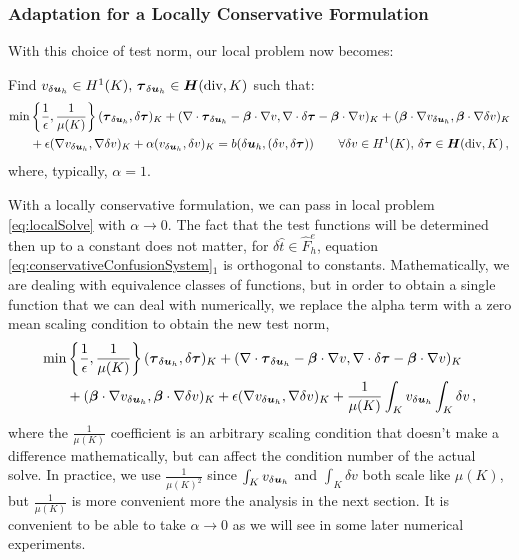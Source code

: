 \documentclass[Proposal.tex]{subfiles}
\begin{document}
\subsubsection{Adaptation for a Locally Conservative Formulation}
With this choice of test norm, our local problem now becomes:

Find $v_{\delta\boldsymbol{u}_h}\in H^{1}(K),\,\boldsymbol\tau_{\delta\boldsymbol{u}_h}\in\mbox{\boldmath $H$}(\text{div},K)$ such that:
\begin{align}
\min&\left\{\frac{1}{\epsilon},\frac{1}{\mu(K)}\right\}(\boldsymbol\tau_{\delta\boldsymbol{u}_h},\delta\boldsymbol\tau)_K
+(\nabla\cdot\boldsymbol\tau_{\delta\boldsymbol{u}_h}-\boldsymbol\beta\cdot\nabla
v,\nabla\cdot\delta\boldsymbol\tau-\boldsymbol\beta\cdot\nabla v)_K
+(\boldsymbol\beta\cdot\nabla v_{\delta\boldsymbol{u}_h},\boldsymbol\beta\cdot\nabla \delta v)_K\nonumber\\
&+\epsilon(\nabla v_{\delta\boldsymbol{u}_h},\nabla \delta v)_K
+\alpha(v_{\delta\boldsymbol{u}_h},\delta v)_K
=b(\delta\boldsymbol{u}_h,(\delta v,\delta\boldsymbol\tau))
\quad\quad\forall\delta v\in H^{1}(K),\,\delta\boldsymbol\tau\in\mbox{\boldmath $H$}(\text{div},K)\,,
\label{eq:localSolve}
\end{align}
where, typically, $\alpha=1$.

With a locally conservative formulation, we can pass in local problem
\eqref{eq:localSolve} with $\alpha\rightarrow0$. The fact that the test
functions will be determined then up to a constant does not matter, for
$\delta\hat t\in\hat F_h^e$, equation
\eqref{eq:conservativeConfusionSystem}$_1$ is orthogonal to constants.
Mathematically, we are dealing with equivalence classes of functions, but in
order to obtain a single function that we can deal with numerically, we
replace the alpha term with a zero mean scaling condition to obtain the new
test norm,
\begin{align}
\label{eq:localSolveMod}
\min&\left\{\frac{1}{\epsilon},\frac{1}{\mu(K)}\right\}(\boldsymbol\tau_{\delta\boldsymbol{u}_h},\delta\boldsymbol\tau)_K
+(\nabla\cdot\boldsymbol\tau_{\delta\boldsymbol{u}_h}-\boldsymbol\beta\cdot\nabla
v,\nabla\cdot\delta\boldsymbol\tau-\boldsymbol\beta\cdot\nabla v)_K\\
&+(\boldsymbol\beta\cdot\nabla v_{\delta\boldsymbol{u}_h},\boldsymbol\beta\cdot\nabla \delta v)_K\nonumber
+\epsilon(\nabla v_{\delta\boldsymbol{u}_h},\nabla \delta v)_K
+\frac{1}{\mu(K)}\int_Kv_{\delta\boldsymbol{u}_h}\int_K\delta v\,,
\end{align}
where the $\frac{1}{\mu(K)}$ coefficient is an arbitrary scaling condition
that doesn't make a difference mathematically, but can affect the condition
number of the actual solve. In practice, we use $\frac{1}{\mu(K)^2}$
since $\int_Kv_{\delta\boldsymbol{u}_h}$ and $\int_K\delta v$ both scale like
$\mu(K)$, but $\frac{1}{\mu(K)}$ is more convenient more the analysis in the
next section.
It is convenient to be able to take $\alpha\rightarrow0$ as we will see in
some later numerical experiments.
\end{document}

